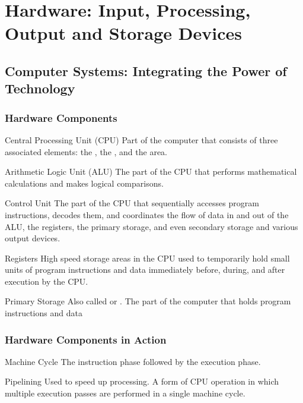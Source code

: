 \documentclass[\main/notes.tex]{subfiles}
\begin{document}
	\setcounter{chapter}{2}
	\chapter{Hardware: Input, Processing, Output and Storage Devices}
		\section{Computer Systems: Integrating the Power of Technology}
			\subsection{Hardware Components}
				\begin{definition}{Central Processing Unit (CPU)}
					Part of the computer that consists of three associated elements: the , the , and the  area.
				\end{definition}
				\begin{definition}{Arithmetic Logic Unit (ALU)}
					The part of the CPU that performs mathematical calculations and makes logical comparisons.
				\end{definition}
				\begin{definition}{Control Unit}
					The part of the CPU that sequentially accesses program instructions, decodes them, and coordinates the flow of data in and out of the ALU, the registers, the primary storage, and even secondary storage and various output devices.
				\end{definition}
				\begin{definition}{Registers}
					High speed storage areas in the CPU used to temporarily hold small units of program instructions and data immediately before, during, and after execution by the CPU.
				\end{definition}
				\begin{definition}{Primary Storage}
					Also called  or . The part of the computer that holds program instructions and data
				\end{definition}
			\subsection{Hardware Components in Action}
				\begin{definition}{Machine Cycle}
					The instruction phase followed by the execution phase.
				\end{definition}
				\begin{sidenote}{Pipelining}
					Used to speed up processing. A form of CPU operation in which multiple execution passes are performed in a single machine cycle.
				\end{sidenote}
\end{document}
